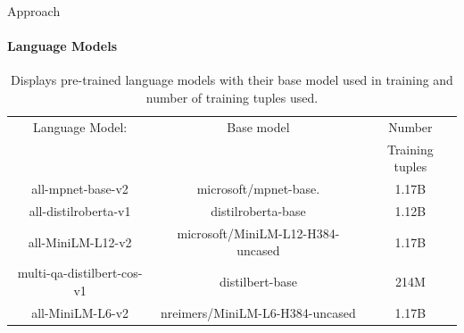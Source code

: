\documentclass[aspectratio=169]{beamer}
\begin{document}
\begin{frame}{Approach}
\framesubtitle{Language Models}
\begin{table}
	\begin{center}
		\begin{tabular}{ |c|c|c| }
			\hline
			Language Model: & Base model & Number \\&&Training tuples  
			\\ \hline 
			all-mpnet-base-v2\cite{SBERT} & 	microsoft/mpnet-base. &1.17B
			
			\\ \hline
			all-distilroberta-v1\cite{SBERT} & 	distilroberta-base &1.12B
			\\ \hline
			all-MiniLM-L12-v2\cite{SBERT} & 		microsoft/MiniLM-L12-H384-uncased &1.17B
			\\ \hline
			multi-qa-distilbert-cos-v1\cite{SBERT} & 	distilbert-base &214M
			\\ \hline
			all-MiniLM-L6-v2\cite{SBERT} & 		nreimers/MiniLM-L6-H384-uncased &1.17B
			\\ \hline
		\end{tabular}
		\caption{Displays pre-trained language models with their base model used in training and number of training tuples used\cite{SBERT}.}
		\label{table:language models}
	\end{center}
\end{table}
\end{frame}
\end{document}
